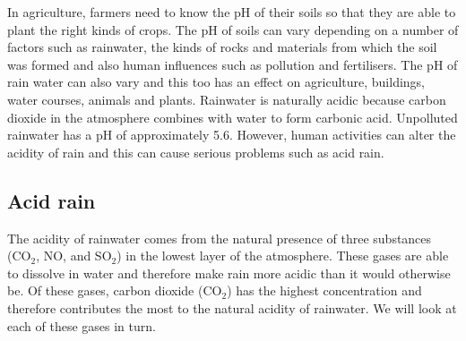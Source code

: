 In agriculture, farmers need to know the pH of their soils so that they are able to plant the right kinds of crops. The pH of soils can vary depending on a number of factors such as rainwater, the kinds of rocks and materials from which the soil was formed and also human influences such as pollution and fertilisers. The pH of rain water can also vary and this too has an effect on agriculture, buildings, water courses, animals and plants. Rainwater is naturally acidic because carbon dioxide in the atmosphere combines with water to form carbonic acid. Unpolluted rainwater has a pH of approximately 5.6. However, human activities can alter the acidity of rain and this can cause serious problems such as acid rain.



\subsection{Acid rain}

The acidity of rainwater comes from the natural presence of three substances (CO$_{2}$, NO, and SO$_{2}$) in the lowest layer of the atmosphere. These gases are able to dissolve in water and therefore make rain more acidic than it would otherwise be. Of these gases, carbon dioxide (CO$_{2}$) has the highest concentration and therefore contributes the most to the natural acidity of rainwater. We will look at each of these gases in turn.


